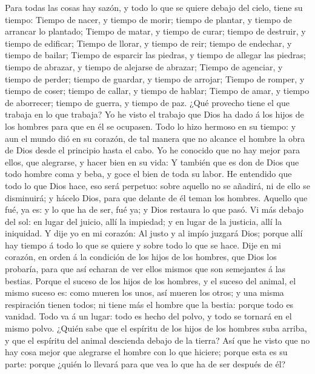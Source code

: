  Para todas las cosas hay sazón, y todo lo que se quiere
debajo del cielo, tiene su tiempo:  Tiempo de nacer, y
tiempo de morir; tiempo de plantar, y tiempo de arrancar lo plantado;
 Tiempo de matar, y tiempo de curar; tiempo de destruir, y
tiempo de edificar;  Tiempo de llorar, y tiempo de reir;
tiempo de endechar, y tiempo de bailar;  Tiempo de esparcir
las piedras, y tiempo de allegar las piedras; tiempo de abrazar, y
tiempo de alejarse de abrazar;  Tiempo de agenciar, y tiempo
de perder; tiempo de guardar, y tiempo de arrojar;  Tiempo
de romper, y tiempo de coser; tiempo de callar, y tiempo de hablar;
 Tiempo de amar, y tiempo de aborrecer; tiempo de guerra, y
tiempo de paz.  ¿Qué provecho tiene el que trabaja en lo que
trabaja?  Yo he visto el trabajo que Dios ha dado á los
hijos de los hombres para que en él se ocupasen.  Todo lo
hizo hermoso en su tiempo: y aun el mundo dió en su corazón, de tal
manera que no alcance el hombre la obra de Dios desde el principio hasta
el cabo.  Yo he conocido que no hay mejor para ellos, que
alegrarse, y hacer bien en su vida:  Y también que es don
de Dios que todo hombre coma y beba, y goce el bien de toda su labor.
 He entendido que todo lo que Dios hace, eso será perpetuo:
sobre aquello no se añadirá, ni de ello se disminuirá; y hácelo Dios,
para que delante de él teman los hombres.  Aquello que fué,
ya es: y lo que ha de ser, fué ya; y Dios restaura lo que pasó.
 Vi más debajo del sol: en lugar del juicio, allí la
impiedad; y en lugar de la justicia, allí la iniquidad.  Y
dije yo en mi corazón: Al justo y al impío juzgará Dios; porque allí hay
tiempo á todo lo que se quiere y sobre todo lo que se hace.
 Dije en mi corazón, en orden á la condición de los hijos
de los hombres, que Dios los probaría, para que así echaran de ver ellos
mismos que son semejantes á las bestias.  Porque el suceso
de los hijos de los hombres, y el suceso del animal, el mismo suceso es:
como mueren los unos, así mueren los otros; y una misma respiración
tienen todos; ni tiene más el hombre que la bestia: porque todo es
vanidad.  Todo va á un lugar: todo es hecho del polvo, y
todo se tornará en el mismo polvo.  ¿Quién sabe que el
espíritu de los hijos de los hombres suba arriba, y que el espíritu del
animal descienda debajo de la tierra?  Así que he visto que
no hay cosa mejor que alegrarse el hombre con lo que hiciere; porque
esta es su parte: porque ¿quién lo llevará para que vea lo que ha de ser
después de él?

